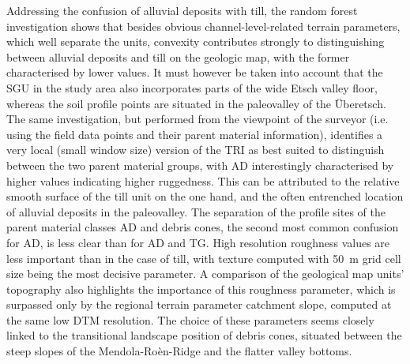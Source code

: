 \documentclass[preprint,12pt,authoryear]{elsarticle}
\begin{document}
Addressing the confusion of alluvial deposits with till, the random forest investigation shows that besides obvious channel-level-related terrain parameters, which well separate the units, convexity contributes strongly to distinguishing between alluvial deposits and till on the geologic map, with the former characterised by lower values. It must however be taken into account that the SGU in the study area also incorporates parts of the wide Etsch valley floor, whereas the soil profile points are situated in the paleovalley of the {\"U}beretsch. The same investigation, but performed from the viewpoint of the surveyor (i.e. using the field data points and their parent material information), identifies a very local (small window size) version of the TRI as best suited to distinguish between the two parent material groups, with AD interestingly characterised by higher values indicating higher ruggedness. This can be attributed to the relative smooth surface of the till unit on the one hand, and the often entrenched location of alluvial deposits in the paleovalley. The separation of the profile sites of the parent material classes AD and debris cones, the second most common confusion for AD, is less clear than for AD and TG. High resolution roughness values are less important than in the case of till, with texture computed with  50~m grid cell size being the most decisive parameter. A comparison of the geological map units' topography also highlights the importance of this roughness parameter, which is surpassed only by the regional terrain parameter catchment slope, computed at the same low DTM resolution. The choice of these parameters seems closely linked to the transitional landscape position of debris cones, situated between the steep slopes of the Mendola-Ro\`en-Ridge and the flatter valley bottoms. 
\end{document}
